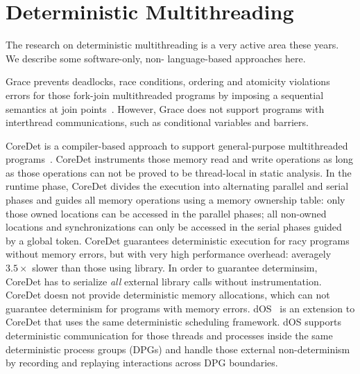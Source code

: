 \section{Deterministic Multithreading}
The research on deterministic multithreading is a very active area these years. We describe some software-only, non- language-based approaches here.

Grace prevents deadlocks, race conditions, ordering and atomicity violations errors for those fork-join multithreaded programs by imposing a sequential semantics at join points~\cite{grace}. However, Grace does not support programs with interthread communications, such as conditional variables and barriers.

CoreDet is a compiler-based approach to 
support general-purpose multithreaded programs~\cite{Bergan:2010:CCR:1736020.1736029}. 
CoreDet instruments those memory read and write operations as long
as those operations can not be proved to be thread-local in static analysis. 
In the runtime phase, CoreDet divides the execution into 
alternating parallel and serial phases and guides all memory operations 
using a memory ownership table: only those owned locations can be accessed
in the parallel phases; all non-owned locations and synchronizations can only 
be accessed in the serial phases guided by a global token.
CoreDet guarantees deterministic execution for racy programs without memory errors,
but with very high performance overhead: 
averagely $3.5\times$ slower than those using \pthreads{} library.
In order to guarantee determinsim, 
CoreDet has to serialize \emph{all} external library calls without instrumentation.
CoreDet doesn not provide deterministic 
memory allocations, which can not guarantee determinism for programs with memory errors.  
dOS~\cite{deterministic-process-groups} is an extension to CoreDet that uses the same deterministic scheduling framework.  dOS supports deterministic communication for those threads and processes inside the same
deterministic process groups (DPGs) and handle those external non-determinism by recording and
replaying interactions across DPG boundaries. 


